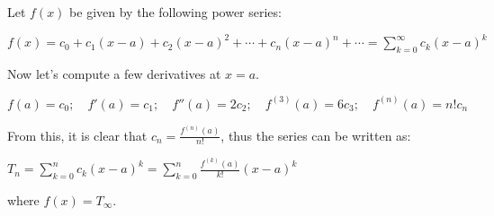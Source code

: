 \documentclass[12pt]{article}
\begin{document}
Let $f(x)$ be given by the following power series:

\begin{center}$\displaystyle f(x)=c_0+c_1(x-a)+c_2(x-a)^2+\cdots+c_n(x-a)^n+\cdots=\sum_{k=0}^{\infty}c_k(x-a)^k$\end{center}

Now let's compute a few derivatives at $x=a.$

\begin{center}$\displaystyle f(a)=c_0;\quad f'(a)=c_1;\quad f''(a)=2c_2;\quad f^{(3)}(a)=6c_3;\quad f^{(n)}(a)=n!c_n$\end{center}

From this, it is clear that $\displaystyle c_n=\frac{f^{(n)}(a)}{n!}$, thus the series can be written as:

\begin{center}$\displaystyle T_n=\sum_{k=0}^nc_k(x-a)^k=\sum_{k=0}^n\frac{f^{(k)}(a)}{k!}(x-a)^k$\end{center}

where $f(x)=T_{\infty}$.
\end{document}
